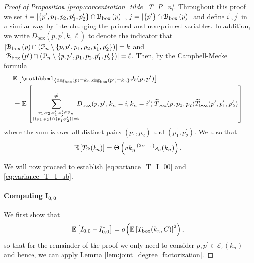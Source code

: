 \begin{proof}[Proof of Proposition \ref{prop:concentration_tilde_T_P_n}]

Throughout this proof we set $i = |\{p^\prime, p_1, p_2, p_1^\prime, p_2^\prime\} \cap {\mathcal B}_{\text{box}}\left(p\right)|$, $j = |\{p^\prime\} \cap {\mathcal B}_{\text{box}}\left(p\right)|$ and define $i^\prime, j^\prime$ in a similar way by interchanging the primed and non-primed variables. In addition, we write $D_{\text{box}}(p,p^\prime,k,\ell)$ to denote the indicator that $|{\mathcal B}_{\text{box}}\left(p\right) \cap ({\mathcal P}_n \setminus \{p, p^\prime, p_1, p_2, p_1^\prime, p_2^\prime\})| = k$ and $|{\mathcal B}_{\text{box}}\left(p^\prime\right) \cap ({\mathcal P}_n \setminus \{p, p^\prime, p_1, p_2, p_1^\prime, p_2^\prime\})| = \ell$. Then, by the Campbell-Mecke formula
\begin{align*}
	&\Exp{\ind{\Dbox(p) = k_n, \Dbox(p^\prime) = k_n} J_b(p,p^\prime)}\\
	&= \Exp{\sum_{p_1, p_2, p_1^\prime, p_2^\prime \in \Pcal_n 
		\atop |\{p_1, p_2\} \cap \{p_1^\prime, p_2^\prime\}| = b}^{\ne}
			\hspace{-7pt} D_{\text{box}}(p,p^\prime, k_n-i,k_n- i^\prime) \,
			\widetilde{T}_{\text{box}}(p,p_1,p_2) \widetilde{T}_{\text{box}}(p^\prime, p_1^\prime, p_2^\prime)}
\end{align*}
where the sum is over all distinct pairs $(p_1, p_2)$ and $(p_1^\prime, p_2^\prime)$. We also that 
\[
	\mathbb{E}\left[T_{{\mathcal P}}(k_n)\right] = \Theta\left(n k_n^{-(2\alpha - 1)} s_\alpha(k_n)\right).
\]

We will now proceed to establish \eqref{eq:variance_T_I_00} and \eqref{eq:variance_T_I_ab}. 

\paragraph{Computing $\bm{I_{0,0}}$}
We first show that
\begin{equation}\label{eq:I_ab_ast_main}
	\mathbb{E}\left[I_{0,0} - I_{0,0}^\ast\right] = o\left(\mathbb{E}\left[T_{\text{box}}(k_n,C)\right]^2\right),
\end{equation}
so that for the remainder of the proof we only need to consider $p, p^\prime \in \mathcal{E}_\varepsilon(k_n)$ and hence, we can apply Lemma \ref{lem:joint_degree_factorization}. 


\end{proof}
